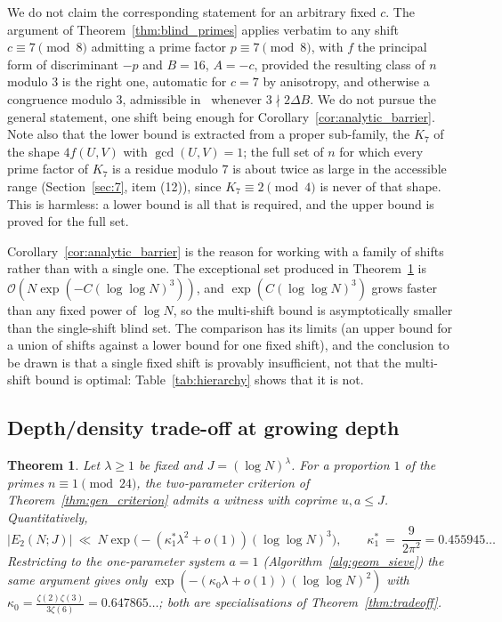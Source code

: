 \documentclass[11pt, a4paper]{article}
\theoremstyle{plain}
\newtheorem{theorem}{Theorem}[section]
\theoremstyle{definition}
\begin{document}
We do not claim the corresponding statement for an arbitrary fixed $c$. The argument of Theorem~\ref{thm:blind_primes} applies verbatim to any shift $c\equiv7\pmod 8$ admitting a prime factor $p\equiv7\pmod 8$, with $f$ the principal form of discriminant $-p$ and $B=16$, $A=-c$, provided the resulting class of $n$ modulo $3$ is the right one, automatic for $c=7$ by anisotropy, and otherwise a congruence modulo $3$, admissible in~\cite[Thm.~1.1(2)]{fuchs2025} whenever $3\nmid2\Delta B$. We do not pursue the general statement, one shift being enough for Corollary~\ref{cor:analytic_barrier}. Note also that the lower bound is extracted from a proper sub-family, the $K_7$ of the shape $4f(U,V)$ with $\gcd(U,V)=1$; the full set of $n$ for which every prime factor of $K_7$ is a residue modulo $7$ is about twice as large in the accessible range (Section~\ref{sec:7}, item (12)), since $K_7\equiv2\pmod4$ is never of that shape. This is harmless: a lower bound is all that is required, and the upper bound is proved for the full set.

Corollary~\ref{cor:analytic_barrier} is the reason for working with a family of shifts rather than with a single one. The exceptional set produced in Theorem~\ref{thm:metric_theorem} is $\mathcal{O}(N\exp(-C(\log\log N)^{3}))$, and $\exp(C(\log\log N)^{3})$ grows faster than any fixed power of $\log N$, so the multi-shift bound is asymptotically smaller than the single-shift blind set. The comparison has its limits (an upper bound for a union of shifts against a lower bound for one fixed shift), and the conclusion to be drawn is that a single fixed shift is provably insufficient, not that the multi-shift bound is optimal: Table~\ref{tab:hierarchy} shows that it is not.

\subsection{Depth/density trade-off at growing depth} \label{sec:5.2}

\begin{theorem} \label{thm:metric_theorem}
Let $\lambda\ge1$ be fixed and $J=(\log N)^{\lambda}$. For a proportion $1$ of the primes $n \equiv 1 \pmod{24}$, the two-parameter criterion of Theorem~\ref{thm:gen_criterion} admits a witness with coprime $u,a\le J$. Quantitatively,
$$|E_2(N;J)|\ \ll\ N\exp\big(-(\kappa_1^{\ast}\lambda^{2}+o(1))(\log\log N)^{3}\big),\qquad \kappa_1^{\ast}\ =\ \frac{9}{2\pi^{2}}=0.455945\ldots$$
Restricting to the one-parameter system $a=1$ (Algorithm~\ref{alg:geom_sieve}) the same argument gives only $\exp(-(\kappa_0\lambda+o(1))(\log\log N)^{2})$ with $\kappa_0=\frac{\zeta(2)\zeta(3)}{3\zeta(6)}=0.647865\ldots$; both are specialisations of Theorem~\ref{thm:tradeoff}.
\end{theorem}
\end{document}
